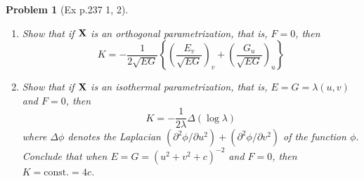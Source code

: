 \documentclass[10pt,a4paper]{article}
\newcounter{theProblemCounter}
\newtheorem{problem}[theProblemCounter]{Problem}
\begin{document}
\setcounter{theProblemCounter}{7}
\begin{problem}[Ex p.237 1, 2]
\begin{enumerate}
\item[(a)]
Show that if $\mathbf{X}$ is an orthogonal parametrization, that is, $F=0$, then
\[
K=-\frac{1}{2\sqrt{EG}}\left\{\left(\frac{E_v}{\sqrt{EG}}\right)_v+\left(\frac{G_u}{\sqrt{EG}}\right)_u\right\}
\]
\item[(b)]
Show that if $\mathbf{X}$ is an isothermal parametrization, that is, $E=G=\lambda(u,v)$ and $F=0$, then
\[
K=-\frac{1}{2\lambda}\Delta(\log\lambda)
\]
where $\Delta\phi$ denotes the Laplacian $(\partial^2\phi/\partial u^2)+(\partial^2\phi/\partial v^2)$ of the function $\phi$. Conclude that when $E=G=(u^2+v^2+c)^{-2}$ and $F=0$, then $K=\textrm{const}.=4c$.
\end{enumerate}
\end{problem}
\end{document}

